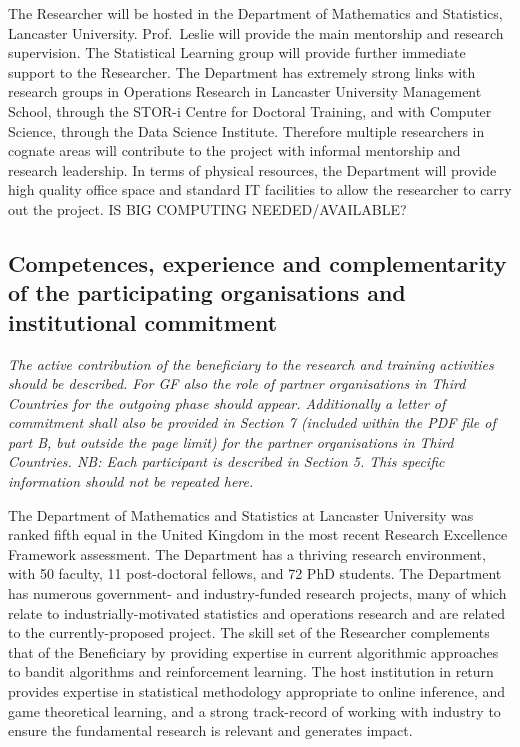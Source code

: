 \documentclass[a4paper,11pt]{article}
\begin{document}
The Researcher will be hosted in the Department of Mathematics and Statistics, Lancaster University.  Prof.\ Leslie will provide the main mentorship and research supervision.  The Statistical Learning group will provide further immediate support to the Researcher.  The Department has extremely strong links with research groups in Operations Research in Lancaster University Management School, through the STOR-i Centre for Doctoral Training, and with Computer Science, through the Data Science Institute.  Therefore multiple researchers in cognate areas will contribute to the project with informal mentorship and research leadership.  In terms of physical resources, the Department will provide high quality office space and standard IT facilities to allow the researcher to carry out the project.  IS BIG COMPUTING NEEDED/AVAILABLE?

\subsection{Competences, experience and complementarity of the participating organisations and institutional commitment}
\label{sec:competences}


{\em
The active contribution of the beneficiary to the research and training activities should be described. For GF also the role of partner organisations in Third Countries for the outgoing phase should appear. Additionally a letter of commitment shall also be provided in Section 7 (included within the PDF file of part B, but outside the page limit) for the partner organisations in Third Countries.
NB: Each participant is described in Section 5. This specific information should not be repeated here.
}

The Department of Mathematics and Statistics at Lancaster University was ranked fifth equal in the United Kingdom in the most recent Research Excellence Framework assessment.  The Department has a thriving research environment, with 50 faculty, 11 post-doctoral fellows, and 72 PhD students.  The Department has numerous government- and industry-funded research projects, many of which relate to industrially-motivated statistics and operations research and are related to the currently-proposed project.  The skill set of the Researcher complements that of the Beneficiary by providing expertise in current algorithmic approaches to bandit algorithms and reinforcement learning.  The host institution in return provides expertise in statistical methodology appropriate to online inference, and game theoretical learning, and a strong track-record of working with industry to ensure the fundamental research is relevant and generates impact.
\end{document}
